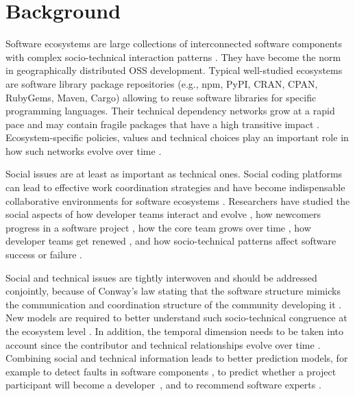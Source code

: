 

\section{Background}

Software ecosystems are large collections of interconnected software components with complex socio-technical interaction patterns \cite{Lungu2009,ManikasHansen2013}. They have become the norm in geographically distributed OSS  development. Typical well-studied ecosystems are software library package %
repositories \cite{Decan2017SANER,Kikas2017,Dietrich2019} (e.g., npm, PyPI, CRAN, CPAN, RubyGems, Maven, Cargo) allowing to reuse software libraries for specific programming languages.
 Their technical dependency networks grow at a rapid pace and may contain fragile packages that have a high transitive impact \cite{Decan2019EMSE}. Ecosystem-specific policies, values and technical choices play an important role in how such networks evolve over time \cite{Bogart2016}.

Social issues are at least as important as technical ones. Social coding platforms can lead to effective work coordination strategies \cite{DabbishSTH12} and have become indispensable collaborative environments for software ecosystems \cite{Herbsleb1999}.
Researchers have studied the social aspects of how developer teams interact and evolve \cite{lopezfernandez2006:sna}, how newcomers progress in a software project \cite{Zhou2011-ICSE,Zhou2012-ICSE}, how the core team grows over time \cite{Robles2009MSR}, how developer teams get renewed \cite{Constantinou2017SANER}, and how socio-technical patterns affect software success or failure \cite{SurianTLCL13}. 

Social and technical issues are tightly interwoven and should be addressed conjointly, because of Conway's law stating that the software structure mimicks the communication and coordination structure of the community developing it \cite{Conway1968, Herbsleb1999, Kwan2011,Blincoe2019}. New models are required to better understand such socio-technical congruence at the ecosystem level \cite{Palyart2018TSE}. In addition, the temporal dimension needs to be taken into account since the contributor and technical relationships evolve over time \cite{Cataldo2008}.
Combining social and technical information leads to better prediction models, for example to detect faults in software components \cite{Bird2009,Bhattacharya2012}, to predict whether a project participant will become a developer~\cite{Gharehyazie2013-ICSM}, and to recommend software experts \cite{Kintab:2014:RSE:2735522.2735526}.

